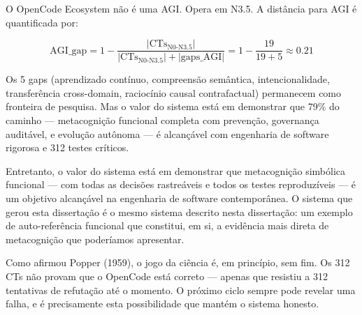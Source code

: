 O OpenCode Ecosystem não é uma AGI. Opera em N3.5. A distância para AGI é quantificada por:

\begin{equation}
\text{AGI\_gap} = 1 - \frac{|\text{CTs}_{\text{N0-N3.5}}|}{|\text{CTs}_{\text{N0-N3.5}}| + |\text{gaps\_AGI}|} = 1 - \frac{19}{19 + 5} \approx 0.21
\label{eq:agi_gap}
\end{equation}

Os 5 gaps (aprendizado contínuo, compreensão semântica, intencionalidade, transferência cross-domain, raciocínio causal contrafactual) permanecem como fronteira de pesquisa. Mas o valor do sistema está em demonstrar que 79\% do caminho — metacognição funcional completa com prevenção, governança auditável, e evolução autônoma — é alcançável com engenharia de software rigorosa e 312 testes críticos.

Entretanto, o valor do sistema está em demonstrar que metacognição simbólica funcional — com todas as decisões rastreáveis e todos os testes reproduzíveis — é um objetivo alcançável na engenharia de software contemporânea. O sistema que gerou esta dissertação é o mesmo sistema descrito nesta dissertação: um exemplo de auto-referência funcional que constitui, em si, a evidência mais direta de metacognição que poderíamos apresentar.

Como afirmou Popper (1959), o jogo da ciência é, em princípio, sem fim. Os 312 CTs não provam que o OpenCode está correto — apenas que resistiu a 312 tentativas de refutação até o momento. O próximo ciclo sempre pode revelar uma falha, e é precisamente esta possibilidade que mantém o sistema honesto.
